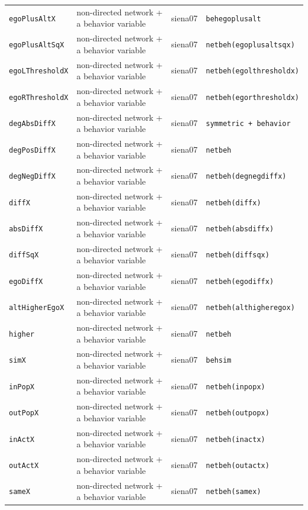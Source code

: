 \begin{longtable}{@{}p{2.6cm}p{3.2cm}p{2.9cm}p{5.4cm}@{}}
\texttt{egoPlusAltX} & non-directed network + a behavior variable & siena07 & \texttt{behegoplusalt}\\
\texttt{egoPlusAltSqX} & non-directed network + a behavior variable & siena07 & \texttt{netbeh(egoplusaltsqx)}\\
\texttt{egoLThresholdX} & non-directed network + a behavior variable & siena07 & \texttt{netbeh(egolthresholdx)}\\
\texttt{egoRThresholdX} & non-directed network + a behavior variable & siena07 & \texttt{netbeh(egorthresholdx)}\\
\texttt{degAbsDiffX} & non-directed network + a behavior variable & siena07 & \texttt{symmetric + behavior}\\
\texttt{degPosDiffX} & non-directed network + a behavior variable & siena07 & \texttt{netbeh}\\
\texttt{degNegDiffX} & non-directed network + a behavior variable & siena07 & \texttt{netbeh(degnegdiffx)}\\
\texttt{diffX} & non-directed network + a behavior variable & siena07 & \texttt{netbeh(diffx)}\\
\texttt{absDiffX} & non-directed network + a behavior variable & siena07 & \texttt{netbeh(absdiffx)}\\
\texttt{diffSqX} & non-directed network + a behavior variable & siena07 & \texttt{netbeh(diffsqx)}\\
\texttt{egoDiffX} & non-directed network + a behavior variable & siena07 & \texttt{netbeh(egodiffx)}\\
\texttt{altHigherEgoX} & non-directed network + a behavior variable & siena07 & \texttt{netbeh(althigheregox)}\\
\texttt{higher} & non-directed network + a behavior variable & siena07 & \texttt{netbeh}\\
\texttt{simX} & non-directed network + a behavior variable & siena07 & \texttt{behsim}\\
\texttt{inPopX} & non-directed network + a behavior variable & siena07 & \texttt{netbeh(inpopx)}\\
\texttt{outPopX} & non-directed network + a behavior variable & siena07 & \texttt{netbeh(outpopx)}\\
\texttt{inActX} & non-directed network + a behavior variable & siena07 & \texttt{netbeh(inactx)}\\
\texttt{outActX} & non-directed network + a behavior variable & siena07 & \texttt{netbeh(outactx)}\\
\texttt{sameX} & non-directed network + a behavior variable & siena07 & \texttt{netbeh(samex)}\\

\end{longtable}
